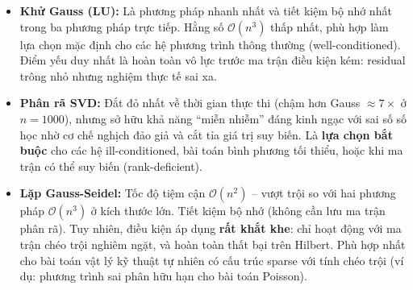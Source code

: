 \begin{itemize}
    \item \textbf{Khử Gauss (LU):} Là phương pháp nhanh nhất và tiết kiệm bộ nhớ nhất trong ba phương pháp trực tiếp. Hằng số $\mathcal{O}(n^3)$ thấp nhất, phù hợp làm lựa chọn mặc định cho các hệ phương trình thông thường (well-conditioned). Điểm yếu duy nhất là hoàn toàn vô lực trước ma trận điều kiện kém: residual trông nhỏ nhưng nghiệm thực tế sai xa.

    \item \textbf{Phân rã SVD:} Đắt đỏ nhất về thời gian thực thi (chậm hơn Gauss $\approx 7\times$ ở $n = 1000$), nhưng sở hữu khả năng ``miễn nhiễm'' đáng kinh ngạc với sai số số học nhờ cơ chế nghịch đảo giả và cắt tỉa giá trị suy biến. Là \textbf{lựa chọn bắt buộc} cho các hệ ill-conditioned, bài toán bình phương tối thiểu, hoặc khi ma trận có thể suy biến (rank-deficient).

    \item \textbf{Lặp Gauss-Seidel:} Tốc độ tiệm cận $\mathcal{O}(n^2)$ -- vượt trội so với hai phương pháp $\mathcal{O}(n^3)$ ở kích thước lớn. Tiết kiệm bộ nhớ (không cần lưu ma trận phân rã). Tuy nhiên, điều kiện áp dụng \textbf{rất khắt khe}: chỉ hoạt động với ma trận chéo trội nghiêm ngặt, và hoàn toàn thất bại trên Hilbert. Phù hợp nhất cho bài toán vật lý kỹ thuật tự nhiên có cấu trúc sparse với tính chéo trội (ví dụ: phương trình sai phân hữu hạn cho bài toán Poisson).
\end{itemize}
